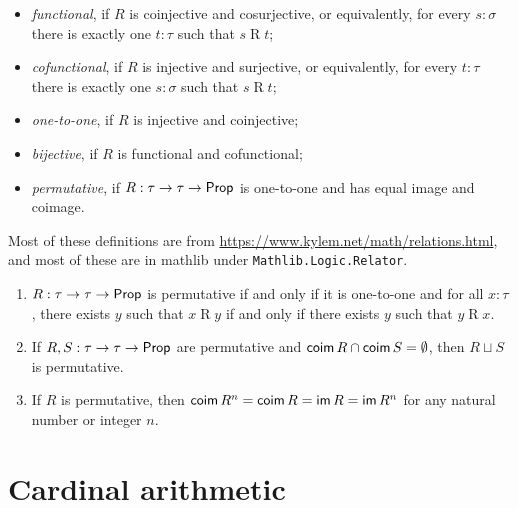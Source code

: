 \begin{definition-no-bp}
\begin{itemize}
    \item \emph{functional}, if \( R \) is coinjective and cosurjective, or equivalently, for every \( s : \sigma \) there is exactly one \( t : \tau \) such that \( s \mathrel{R} t \);
    \item \emph{cofunctional}, if \( R \) is injective and surjective, or equivalently, for every \( t : \tau \) there is exactly one \( s : \sigma \) such that \( s \mathrel{R} t \);
    \item \emph{one-to-one}, if \( R \) is injective and coinjective;
    \item \emph{bijective}, if \( R \) is functional and cofunctional;
    \item \emph{permutative}, if \( R : \tau \to \tau \to \mathsf{Prop} \) is one-to-one and has equal image and coimage.
  \end{itemize}
  Most of these definitions are from \url{https://www.kylem.net/math/relations.html}, and most of these are in mathlib under \texttt{Mathlib.Logic.Relator}.
\end{definition-no-bp}
\begin{proposition-no-bp}\mbox\negthinspace
  \label{prop:relation_results}
  \begin{enumerate}
    \item \( R : \tau \to \tau \to \mathsf{Prop} \) is permutative if and only if it is one-to-one and for all \( x : \tau \), there exists \( y \) such that \( x \mathrel{R} y \) if and only if there exists \( y \) such that \( y \mathrel{R} x \).
    \item If \( R, S : \tau \to \tau \to \mathsf{Prop} \) are permutative and \( \operatorname{\mathsf{coim}} R \cap \operatorname{\mathsf{coim}} S = \emptyset \), then \( R \sqcup S \) is permutative.
    \item If \( R \) is permutative, then \( \operatorname{\mathsf{coim}} R^n = \operatorname{\mathsf{coim}} R = \operatorname{\mathsf{im}} R = \operatorname{\mathsf{im}} R^n \) for any natural number or integer \( n \).
  \end{enumerate}
\end{proposition-no-bp}

\section{Cardinal arithmetic}


